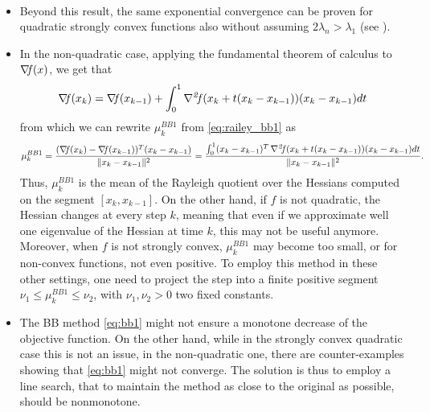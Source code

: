 \documentclass[10pt,a4paper]{article}
\begin{document}
\begin{remark}$\;$\\
	\vspace{-5mm}
	\begin{itemize}
		\item Beyond this result, the same exponential convergence can be proven for quadratic strongly convex functions also without assuming $2\lambda_n>\lambda_1$ (see \cite{dai02a}). 
		\item In the non-quadratic case, applying the fundamental theorem of calculus to $\operatorname*{\mathit{\nabla \!f}}(x)$, we get that
		\begin{equation*}
			\operatorname*{\mathit{\nabla \!f}}(x_k)=\operatorname*{\mathit{\nabla \!f}}(x_{k-1}) + \int_{0}^{1} \operatorname*{\mathit{\nabla^2 \!f}}(x_k+t(x_k-x_{k-1})) (x_k-x_{k-1}) dt
		\end{equation*} 
		from which we can rewrite $\mu_k^{BB1}$ from \eqref{eq:railey_bb1} as
		\begin{equation*}
			\mu_k^{BB1} = \frac{(\operatorname*{\mathit{\nabla \!f}}(x_k)-\operatorname*{\mathit{\nabla \!f}}(x_{k-1}))^T(x_k-x_{k-1})}{\|x_k - x_{k-1}\|^2} = \frac{\int_{0}^{1}(x_k-x_{k-1})^T \operatorname*{\mathit{\nabla^2 \!f}}(x_k+t(x_k-x_{k-1})) (x_k-x_{k-1}) dt }{\|x_k - x_{k-1}\|^2}.
		\end{equation*}
		Thus, $\mu_k^{BB1}$ is the mean of the Rayleigh quotient over the Hessians computed on the segment $[x_k, x_{k-1}]$. On the other hand, if $f$ is not quadratic, the Hessian changes at every step $k$, meaning that even if we approximate well one eigenvalue of the Hessian at time $k$, this may not be useful anymore. Moreover, when $f$ is not strongly convex, $\mu_k^{BB1}$ may become too small, or for non-convex functions, not even positive. To employ this method in these other settings, one need to project the step into a finite positive segment $\nu_1\leq \mu_k^{BB1}\leq \nu_2$, with $\nu_1, \nu_2>0$ two fixed constants.
		\item The BB method \eqref{eq:bb1} might not ensure a monotone decrease of the objective function. On the other hand, while in the strongly convex quadratic case this is not an issue, in the non-quadratic one, there are counter-examples showing that \eqref{eq:bb1} might not converge. The solution is thus to employ a line search, that to maintain the method as close to the original as possible, should be nonmonotone. 
	\end{itemize}
\end{remark}
\end{document}
